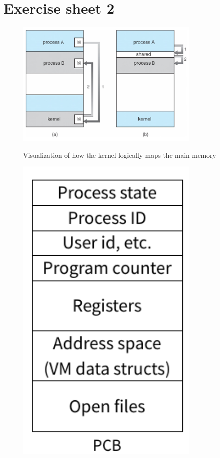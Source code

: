 \documentclass[10pt]{beamer}
\begin{document}
\section{Exercise sheet 2}
\frame{\sectionpage}
\begin{frame}[allowframebreaks]{}
 \begin{figure}
         \includegraphics[keepaspectratio, width=0.8\textwidth, height=0.8\textheight-2\baselineskip-2\baselineskip]{img/012_mem_map.png} \\
         \caption{Visualization of how the kernel logically maps the main memory~\autocite{silberschatz}}
        \end{figure}
        \framebreak
        \begin{figure}
         \includegraphics[keepaspectratio, width=0.8\textwidth, height=0.8\textheight-2\baselineskip-2\baselineskip]{img/010_pcb.png} \\

\end{figure}
\end{frame}
\end{document}
